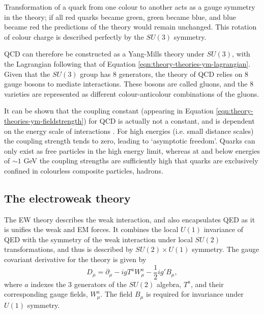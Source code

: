 Transformation of a quark from one colour to another acts as a gauge symmetry in
the theory; if all red quarks became green, green became blue, and blue became
red the predictions of the theory would remain unchanged. This rotation of
colour charge is described perfectly by the $SU(3)$ symmetry.

\ac{QCD} can therefore be constructed as a Yang-Mills theory under $SU(3)$,
with the Lagrangian following that of Equation
\ref{eqn:theory-theories-ym-lagrangian}. Given that the $SU(3)$ group has 8
generators, the theory of \ac{QCD} relies on 8 gauge bosons to mediate
interactions. These bosons are called gluons, and the 8 varieties are
represented as different colour-anticolour combinations of the gluons.

It can be shown that the coupling constant (appearing in Equation
\ref{eqn:theory-theories-ym-fieldstrength}) for \ac{QCD} is actually not a
constant, and is dependent on the energy scale of interactions \cite{PDG2022}.
For high energies (i.e. small distance scales) the coupling strength tends to
zero, leading to `asymptotic freedom'. Quarks can only exist as free particles
in the high energy limit, whereas at and below energies of $\sim1$ GeV the
coupling strengths are sufficiently high that quarks are exclusively confined in
colourless composite particles, hadrons.


\subsection{The electroweak theory}
\label{sec:theory-theories-ew}

The \ac{EW} theory describes the weak interaction, and also encapsulates \ac{QED}
as it is unifies the weak and \ac{EM} forces.  It combines the local $U(1)$
invariance of \ac{QED} with the symmetry of the weak interaction under local
$SU(2)$ transformations, and thus is described by $SU(2)\times U(1)$ symmetry.
The gauge covariant derivative for the theory is given by
%
\begin{equation*}
  D_\mu = \partial_\mu - igT^a W^a_\mu - \frac12 ig'B_\mu,
\end{equation*}
where $a$ indexes the 3 generators of the $SU(2)$ algebra, $T^a$, and their
corresponding gauge fields, $W^a_\mu$. The field $B_\mu$ is required for
invariance under $U(1)$ symmetry.

